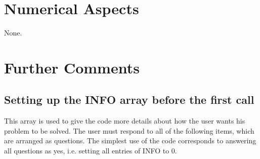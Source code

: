\section{Numerical Aspects}

None.

\section{Further Comments}

\subsection{Setting up the INFO array before the first call}
\label{sec:info}
This array is used to give the code more details about
how the user wants his problem to be solved. The user must respond to
all of the following items, which are arranged as questions. The simplest use
of the code corresponds to answering all questions as yes,
i.e. setting all entries of INFO to 0.
